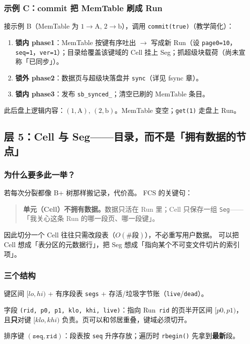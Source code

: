 \subsubsection{示例 C：commit 把 MemTable 刷成 Run}
接示例 B（MemTable 为 $1\to\mathrm{A},\,2\to\mathrm{b}$），调用 \texttt{commit(true)}（教学简化）：

\begin{enumerate}[leftmargin=1.6em]
  \item \textbf{锁内 phase1}：MemTable 按键有序吐出 $\to$ 写成新 Run（设 \texttt{page0=10}，\texttt{seq=1}，\texttt{ver=1}）；目录给覆盖该键域的 Cell 挂上 Seg；抓超级块载荷（尚未宣称「已同步」）。
  \item \textbf{锁外 phase2}：数据页与超级块落盘并 \texttt{sync}（详见 fsync 章）。
  \item \textbf{锁内 phase3}：发布 \texttt{sb\_synced\_}；清空已刷的 MemTable 条目。
\end{enumerate}

此后盘上逻辑内容：$(1,\mathrm{A}),\,(2,\mathrm{b})$。MemTable 变空；\texttt{get(1)} 走盘上 Run。

\subsection{层 5：Cell 与 Seg——目录，而不是「拥有数据的节点」}
\label{sec:cd-cell}

\subsubsection{为什么要多此一举？}
若每次分裂都像 B+ 树那样搬记录，代价高。
FCS 的关键句：

\begin{quote}
\textbf{单元（Cell）不拥有数据。}数据只活在 Run 里；Cell 只保存一组 \texttt{Seg}——「我关心这条 Run 的哪一段页、哪一段键」。
\end{quote}

因此切分一个 Cell 往往只需改段表（$O(\#\text{段})$），不必重写用户数据。
可以把 Cell 想成「表分区的元数据行」，把 Seg 想成「指向某个不可变文件切片的索引项」。

\subsubsection{三个结构}
\begin{description}[style=nextline,leftmargin=2.4em]
  \item[\texttt{Cell}] 键区间 $[lo,hi)$ + 有序段表 \texttt{segs} + 存活/垃圾字节账（\texttt{live}/\texttt{dead}）。
  \item[\texttt{Seg}] 字段 \texttt{(rid, p0, p1, klo, khi, live)}：指向 Run~\texttt{rid} 的页半开区间 $[p0,p1)$，且\textbf{只}对键 $[klo,khi)$ 负责。页可以和邻居重叠，键域必须切开。
  \item[\texttt{SegKey}] 排序键 $(\texttt{seq},\texttt{rid})$：段表按 \texttt{seq} 升序存放；遍历时 \texttt{rbegin()} 先拿到\textbf{最新}段。
\end{description}

